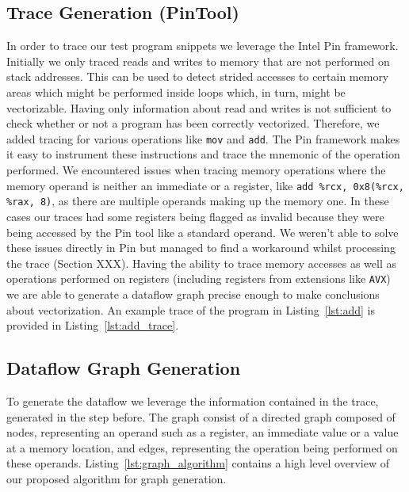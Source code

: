 \documentclass[acmsmall,review, nonacm]{acmart}
\begin{document}
\subsection{Trace Generation (PinTool)}
In order to trace our test program snippets we leverage the Intel Pin framework. Initially we only traced reads 
and writes to memory that are not performed on stack addresses. This can be used to detect strided 
accesses to certain memory areas which might be performed inside loops which, in turn, might be vectorizable.
Having only information about read and writes is not sufficient to check whether or not a program 
has been correctly vectorized. Therefore, we added tracing for various operations like \texttt{mov} and \texttt{add}. 
The Pin framework makes it easy to instrument these instructions and trace the mnemonic of the 
operation performed. We encountered issues when tracing memory operations where the memory operand 
is neither an immediate or a register, like \texttt{add \%rcx, 0x8(\%rcx, \%rax, 8)}, as there are multiple 
operands making up the memory one. In these cases our traces had some registers being flagged as 
invalid because they were being accessed by the Pin tool like a standard operand. We weren't able to solve 
these issues directly in Pin but managed to find a workaround whilst processing the trace (Section XXX).
Having the ability to trace memory accesses as well as operations performed on registers 
(including registers from extensions like \texttt{AVX}) we are able to generate a dataflow graph precise
enough to make conclusions about vectorization.
An example trace of the program in Listing~\ref{lst:add} is provided in Listing~\ref{lst:add_trace}. 





\subsection{Dataflow Graph Generation}

To generate the dataflow we leverage the information contained in the trace, generated in 
the step before. 
The graph consist of a directed graph composed of nodes, representing an operand such as a register, an immediate 
value or a value at a memory location, and edges, representing the operation being performed on these 
operands.
Listing~\ref{lst:graph_algorithm} contains a high level overview of our proposed algorithm for graph generation.
\end{document}
